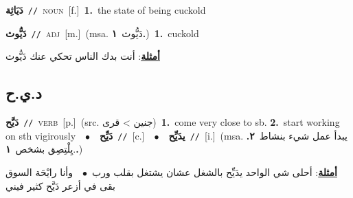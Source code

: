 \documentclass[10pt,a4paper,twoside]{article} %
\begin{document}
\begin{multicols}{2}
{\setlength\topsep{0pt}\textbf{\foreignlanguage{arabic}{دَيَاثِة}}\ {\color{gray}\texttt{//}\color{black}}\ \textsc{noun}\ [f.]\ \textbf{1.}~the state of being cuckold\ } \vspace{2mm}

{\setlength\topsep{0pt}\textbf{\foreignlanguage{arabic}{دَيُّوث}}\ {\color{gray}\texttt{//}\color{black}}\ \textsc{adj}\ [m.]\ \color{gray}(msa. \foreignlanguage{arabic}{دَيُّوث}~\foreignlanguage{arabic}{\textbf{١.}})\color{black}\ \textbf{1.}~cuckold\  \begin{flushright}\color{gray}\foreignlanguage{arabic}{\textbf{\underline{\foreignlanguage{arabic}{أمثلة}}}: أنت بدك الناس تحكي عنك دَيُّوث}\end{flushright}\color{black}} \vspace{2mm}

\vspace{-3mm}
\subsection*{\color{blue}\foreignlanguage{arabic}{د.ي.ح}\color{blue}{}} 

{\setlength\topsep{0pt}\textbf{\foreignlanguage{arabic}{دَيَّح}}\ {\color{gray}\texttt{//}\color{black}}\ \textsc{verb}\ [p.]\ (src. \color{gray}\foreignlanguage{arabic}{جنين > قرى}\color{black})\ \textbf{1.}~come very close to sb.  \textbf{2.}~start working on sth vigirously\ \ $\bullet$\ \ \setlength\topsep{0pt}\textbf{\foreignlanguage{arabic}{دَيِّح}}\ {\color{gray}\texttt{//}\color{black}}\ [c.]\ \ $\bullet$\ \ \setlength\topsep{0pt}\textbf{\foreignlanguage{arabic}{يدَيِّح}}\ {\color{gray}\texttt{//}\color{black}}\ [i.]\ \color{gray}(msa. \foreignlanguage{arabic}{يبدأ عمل شيء بنشاط}~\foreignlanguage{arabic}{\textbf{٢.}}  .\foreignlanguage{arabic}{يِلْتِصِق بشخص}~\foreignlanguage{arabic}{\textbf{١.}})\color{black}\  \begin{flushright}\color{gray}\foreignlanguage{arabic}{\textbf{\underline{\foreignlanguage{arabic}{أمثلة}}}: أحلى شي الواحد يدَيِّح بالشغل عشان يشتغل بقلب ورب\ $\bullet$\ \  وأنا رايْحَة السوق بقى في أزعر دَيَّح كثير فيني}\end{flushright}\color{black}} \vspace{2mm}


\end{multicols}
\end{document}
